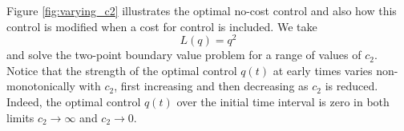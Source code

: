 \documentclass[english,12pt,letter]{article}
\newtheorem{thm}{Theorem}
\newcommand{\Rnot}{\sigma_0}
\newcommand{\Sinf}{x_\infty}
\begin{document}
%

Figure \ref{fig:varying_c2} illustrates the optimal no-cost control and also how this control
is modified when a cost for control is included.  We take
$$
    L(q) = q^2
$$
and solve the two-point boundary value problem for a range of values of $c_2$.
Notice that the strength of the optimal control $q(t)$ at early times varies non-monotonically
with $c_2$, first increasing and then decreasing as $c_2$ is reduced.  Indeed, the optimal
control $q(t)$ over the initial time interval is zero in both limits $c_2 \to \infty$ and $c_2 \to 0$.
\end{document}
